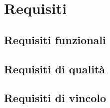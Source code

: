 \chapter{Requisiti}

\section{Requisiti funzionali}

\section{Requisiti di qualità}

\section{Requisiti di vincolo}